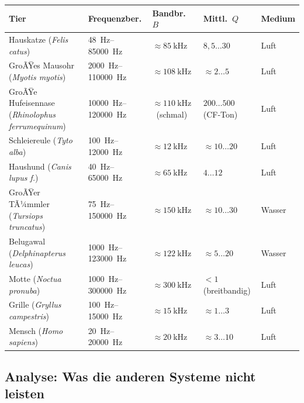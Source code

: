 ﻿\documentclass[12pt,a4paper,titlepage]{report}
\begin{document}
\begin{center}
\renewcommand{\arraystretch}{1.45}
\begin{tabular}{p{3.8cm} p{2.8cm} p{2.2cm} p{2.2cm} p{2.6cm}}
\toprule
\textbf{Tier} & \textbf{Frequenzber.} &
\textbf{Bandbr. $B$} & \textbf{Mittl.\ $Q$} & \textbf{Medium} \\
\midrule
Hauskatze (\textit{Felis catus})
  & \SIrange{48}{85000}{\hertz}
  & $\approx \SI{85}{\kilo\hertz}$
  & $8{,}5 \ldots 30$
  & Luft \\
GroÃŸes Mausohr (\textit{Myotis myotis})
  & \SIrange{2000}{110000}{\hertz}
  & $\approx \SI{108}{\kilo\hertz}$
  & $\approx 2 \ldots 5$
  & Luft \\
GroÃŸe Hufeisennase (\textit{Rhinolophus ferrumequinum})
  & \SIrange{10000}{120000}{\hertz}
  & $\approx \SI{110}{\kilo\hertz}$\ (schmal)
  & $200 \ldots 500$ (CF-Ton)
  & Luft \\
Schleiereule (\textit{Tyto alba})
  & \SIrange{100}{12000}{\hertz}
  & $\approx \SI{12}{\kilo\hertz}$
  & $\approx 10 \ldots 20$
  & Luft \\
Haushund (\textit{Canis lupus f.})
  & \SIrange{40}{65000}{\hertz}
  & $\approx \SI{65}{\kilo\hertz}$
  & $4 \ldots 12$
  & Luft \\
GroÃŸer TÃ¼mmler (\textit{Tursiops truncatus})
  & \SIrange{75}{150000}{\hertz}
  & $\approx \SI{150}{\kilo\hertz}$
  & $\approx 10 \ldots 30$
  & Wasser \\
Belugawal (\textit{Delphinapterus leucas})
  & \SIrange{1000}{123000}{\hertz}
  & $\approx \SI{122}{\kilo\hertz}$
  & $\approx 5 \ldots 20$
  & Wasser \\
Motte (\textit{Noctua pronuba})
  & \SIrange{1000}{300000}{\hertz}
  & $\approx \SI{300}{\kilo\hertz}$
  & $< 1$ (breitbandig)
  & Luft \\
Grille (\textit{Gryllus campestris})
  & \SIrange{100}{15000}{\hertz}
  & $\approx \SI{15}{\kilo\hertz}$
  & $\approx 1 \ldots 3$
  & Luft \\
Mensch (\textit{Homo sapiens})
  & \SIrange{20}{20000}{\hertz}
  & $\approx \SI{20}{\kilo\hertz}$
  & $\approx 3 \ldots 10$
  & Luft \\
\bottomrule
\end{tabular}
\end{center}

\subsection{Analyse: Was die anderen Systeme nicht leisten}
\end{document}
